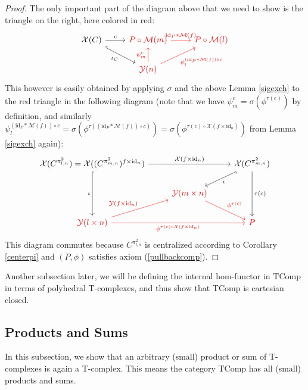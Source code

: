 \documentclass{article}
\theoremstyle{remark}
\theoremstyle{definition}
\newcommand{\id}{\mathrm{id}}
\newcommand{\Y}{\mathcal Y}
\newcommand{\X}{\mathcal X}
\newcommand{\TComp}{\mathrm{TComp}}
\newcommand{\M}{\mathcal M}
\begin{document}
	\begin{proof}
		The only important part of the diagram above that we need to show is the triangle on the right, here colored in red:
		\[\begin{tikzcd}
			\X(C)\arrow[hook]{dr}[swap]{\iota_C}\arrow{r}{c}&\color{red}{P\circ\M(m)}\arrow[color=red]{r}{\id_P*\M(f)}&\color{red}{P\circ\M(l)}\\
			&\color{red}{\Y(n)}\arrow[color=red]{u}{\psi_m^c}\arrow[color=red]{ur}[swap]{\psi_l^{(\id_P*\M(f))\circ c}}
		\end{tikzcd}\]
		This however is easily obtained by applying $\sigma$ and the above Lemma \ref{sigexch} to the red triangle in the following diagram (note that we have $\psi_m^c=\sigma(\phi^{\tau(c)})$ by definition, and similarly $\psi_l^{(\id_P*\M(f))\circ c}=\sigma(\phi^{\tau((\id_P*\M(f))\circ c)})=\sigma(\phi^{\tau(c)\circ\X(f\times\id_n)})$ from Lemma \ref{sigexch} again):
		\[\begin{tikzcd}
			\X(C^{\pi^2_{l,n}})=\X((C^{\pi^2_{m,n}})^{f\times\id_n})
			\arrow[hook]{dd}[swap]{\iota}
			\arrow{rr}{\X(f\times\id_n)}
			&&
			\X(C^{\pi^2_{m,n}})
			\arrow[hook]{ld}{\iota}
			\arrow{dd}{\tau(c)}
			\\&
			\color{red}{\Y(m\times n)}
			\arrow[color=red]{dr}{\phi^{\tau(c)}}
			\\
			\color{red}{\Y(l\times n)}
			\arrow[color=red]{ur}{\Y(f\times\id_n)}
			\arrow[color=red]{rr}[swap]{\phi^{\tau(c)\circ\X(f\times\id_n)}}
			&&
			\color{red}P
		\end{tikzcd}\]
		This diagram commutes because $C^{\pi^2_{l,n}}$ is centralized according to Corollary \ref{centerpi} and $(P,\phi)$ satisfies axiom (\ref{pullbackcomp}).
	\end{proof}
	Another subsection later, we will be defining the internal hom-functor in $\TComp$ in terms of polyhedral T-complexes, and thus show that $\TComp$ is cartesian closed.
	\subsection{Products and Sums}
	In this subsection, we show that an arbitrary (small) product or sum of T-complexes is again a T-complex. This means the category $\TComp$ has all (small) products and sums.
	
\end{document}
